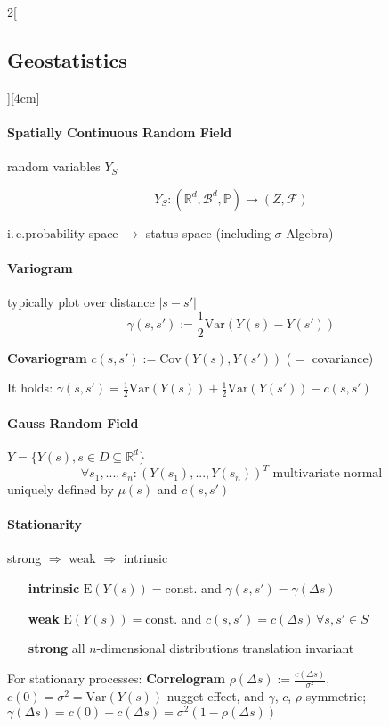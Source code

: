 \documentclass[8pt]{extarticle}
\begin{document}
\begin{multicols}{2}[\subsection{Geostatistics}][4cm] 


\paragraph{Spatially Continuous Random Field} random variables $Y_S$

$$Y_S:(\mathbb{R}^d, \mathcal{B}^d,\mathbb{P}) \rightarrow (Z, \mathcal{F})$$

i.\,e.\@ probability space $\rightarrow$ status space (including $\sigma$-Algebra)


\paragraph{Variogram} typically plot over distance $|s-s'|$
$$\gamma(s,s'):= \frac{1}{2}\mathrm{Var}(Y(s) -Y(s'))$$

\textbf{Covariogram} $c(s,s'):= \mathrm{Cov}(Y(s),Y(s'))$ ($=$ covariance)

It holds: $\gamma(s,s') =\frac{1}{2}\mathrm{Var}(Y(s)) +\frac{1}{2}\mathrm{Var}(Y(s')) -c(s,s')$


\paragraph{Gauss Random Field} $Y=\{Y(s),s\in D \subseteq \mathbb{R}^d\}$
$$\forall s_1,...,s_n: (Y(s_1),...,Y(s_n))^T \text{  multivariate normal}$$
uniquely defined by $\mu(s)$ and $c(s,s')$

\paragraph{Stationarity} strong $\Rightarrow$ weak $\Rightarrow$ intrinsic
\begin{itemize}[leftmargin=6.1em,itemsep=-0.5em]
\item[\textbf{intrinsic}] $\mathrm{E}(Y(s)) = \text{const.}$ and $\gamma(s,s')=\gamma(\Delta s)$
\item[\textbf{weak}] $\mathrm{E}(Y(s)) =  \text{const.}$ and $c(s,s') = c(\Delta s) \,\forall s,s' \in S$
\item[\textbf{strong}] all $n$-dimensional distributions translation invariant
\end{itemize}
For stationary processes: \textbf{Correlogram} $\rho(\Delta s):=\frac{c(\Delta s)}{\sigma^2}$,
$c(0)=\sigma^2 = \mathrm{Var}(Y(s))$ nugget effect, and $\gamma$, $c$, $\rho$ symmetric;
$\gamma(\Delta s) = c(0)-c(\Delta s) = \sigma^2(1-\rho(\Delta s))$


\end{multicols}
\end{document}
